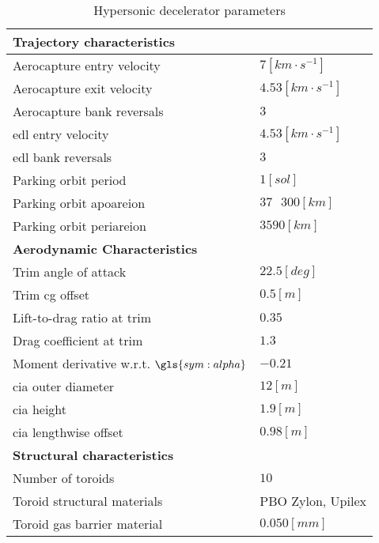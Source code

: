 \begin{table}[H]
	\centering
	\caption{Hypersonic decelerator parameters}
	\label{tab:DeceleratorPar}
	\begin{tabular}{|p{}|p{}|} \hline
		\textbf{Trajectory characteristics}             	& 			\\ \hline \hline
		Aerocapture entry velocity       				&	 $7 \left[km \cdot s^{-1}\right]$ 		\\ \hline
		Aerocapture exit velocity				 		&    $4.53 \left[km \cdot s^{-1}\right]$  	  	\\ \hline
		Aerocapture bank reversals				        &  	 $3$		\\ \hline
		\gls{edl} entry velocity					 	&  	 $4.53 \left[km \cdot s^{-1}\right]$	\\ \hline
		\gls{edl} bank reversals					 	&  	 $3$	\\ \hline
		Parking orbit period						 	&  	 $1 \left[sol\right]$		\\ \hline
		Parking orbit apoareion			 				&  	$37\mbox{ }300 \left[km\right]$		\\ \hline
		Parking orbit periareion			 			&  	$3590 \left[km\right]$		\\ \hline
		\textbf{Aerodynamic Characteristics}			&			\\ \hline \hline
		Trim angle of attack				 			&  $22.5 \left[deg\right]$			\\ \hline
		Trim \gls{cg} offset							&  $0.5 \left[m\right]$		\\ \hline
		Lift-to-drag ratio at trim			 			&  	$0.35$	\\ \hline
		Drag coefficient at trim			 			&  	$1.3$	\\ \hline
		Moment derivative w.r.t. $\gls{sym:alpha}$		&  	$-0.21$		\\ \hline
		\gls{cia} outer diameter						&  	$12 \left[m\right]$		\\ \hline
		\gls{cia} height								&  	$1.9 \left[m\right]$		\\ \hline
		\gls{cia} lengthwise offset						&  	$0.98 \left[m\right]$		\\ \hline
		\textbf{Structural characteristics}				&			\\ \hline \hline
		Number of toroids					 			&   $10$			\\ \hline 
		Toroid structural materials						 			&  	PBO Zylon\textsuperscript{\textregistered}, Upilex		\\ \hline
		Toroid gas barrier material		&	$0.050 \left[mm\right]$		\\ \hline

\end{tabular}
\end{table}
